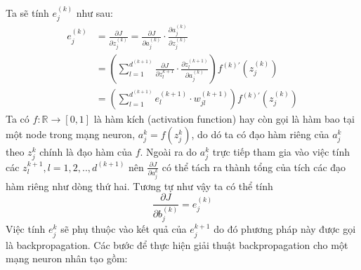 Ta sẽ tính $e_{j}^{(k)}$ như sau:
\begin{align*}
	{e_{j}^{(k)}}
	&=
	{\frac
		{ {\partial} J }
		{ {\partial} {z_{j}^{(k)}} }
	}
	=
	{\frac
		{ {\partial} J }
		{ {\partial} {a_{j}^{(k)}} }
	}
	{\cdot}
	{\frac
		{ {\partial} {a_{j}^{(k)}} }
		{ {\partial} {z_{j}^{(k)}} }
	} \\
	&=\left( 
			 {\sum_{l=1}^{d^{(k+1)}}} 
			 {\frac
			 	{ {\partial} J }
			 	{ {\partial} {z_{l}^{k+1}} } 
			 }
			 {\cdot}
			 {\frac
			 	{ {\partial} {z_{l}^{(k+1)}} }
			 	{ {\partial} {a_{j}^{(k)}} } 
			 }
		\right) 
		{
			{f^{(k)'}} \left( 
					{z_{j}^{(k)}} 
				 \right)
		} \\
	&=\left( 
			 {\sum_{l=1}^{d^{(k+1)}}} 
			 e_{l}^{(k+1)}
			 {\cdot}
			 w_{jl}^{(k+1)}
		\right) 
		{
			{f^{(k)'}} \left( 
					{z_{j}^{(k)}} 
				 \right)
		}
\end{align*}
Ta có $f:{\mathbb{R}}{\rightarrow}[0,1]$ là hàm kích (activation function) hay còn gọi là hàm bao tại một node trong mạng neuron, $a_{j}^{k}=f\left(z_{j}^{k}\right)$, do dó ta có đạo hàm riêng của $a_{j}^{k}$ theo $z_{j}^{k}$ chính là đạo hàm của $f$. Ngoài ra do $a_{j}^{k}$ trực tiếp tham gia vào việc tính các $z_{l}^{k+1},l=1,2,..,d^{(k+1)}$ nên ${\frac{{\partial}J}{{\partial}{a_{j}^{k}}}}$ có thể tách ra thành tổng của tích các đạo hàm riêng như dòng thứ hai. Tương tự như vậy ta có thể tính
\begin{equation}
	\frac
		{ {\partial} J }
		{ {\partial} {b_{j}^{(k)}} }
	= {e_{j}^{(k)}}
\end{equation}
Việc tính ${e_{j}^{k}}$ sẽ phụ thuộc vào kết quả của ${e_{j}^{k+1}}$ do đó phương pháp này được gọi là backpropagation.
Các bước để thực hiện giải thuật backpropagation cho một mạng neuron nhân tạo gồm:
